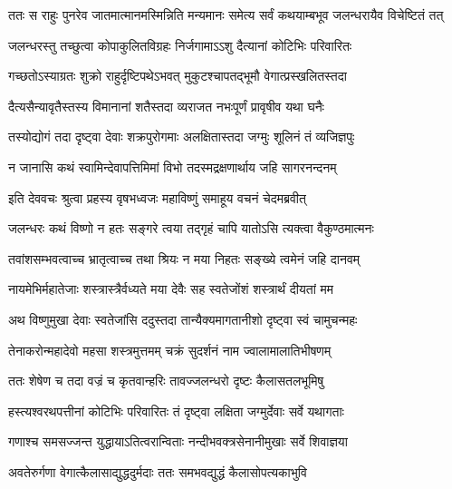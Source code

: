 \twolineshloka
{ततः स राहुः पुनरेव जातमात्मानमस्मिन्निति मन्यमानः}
{समेत्य सर्वं कथयाम्बभूव जलन्धरायैव विचेष्टितं तत्} %





\twolineshloka
{जलन्धरस्तु तच्छुत्वा कोपाकुलितविग्रहः}
{निर्जगामाऽऽशु दैत्यानां कोटिभिः परिवारितः} %

\twolineshloka
{गच्छतोऽस्याग्रतः शुक्रो राहुर्दृष्टिपथेऽभवत्}
{मुकुटश्चापतद्भूमौ वेगात्प्रस्खलितस्तदा} %

\twolineshloka
{दैत्यसैन्यावृतैस्तस्य विमानानां शतैस्तदा}
{व्यराजत नभःपूर्णं प्रावृषीव यथा घनैः} %

\twolineshloka
{तस्योद्योगं तदा दृष्ट्वा देवाः शक्रपुरोगमाः}
{अलक्षितास्तदा जग्मुः शूलिनं तं व्यजिज्ञपुः} %


\twolineshloka
{न जानासि कथं स्वामिन्देवापत्तिमिमां विभो}
{तदस्मद्रक्षणार्थाय जहि सागरनन्दनम्} %


\twolineshloka
{इति देववचः श्रुत्वा प्रहस्य वृषभध्वजः}
{महाविष्णुं समाहूय वचनं चेदमब्रवीत्} %


\twolineshloka
{जलन्धरः कथं विष्णो न हतः सङ्गरे त्वया}
{तद्गृहं चापि यातोऽसि त्यक्त्वा वैकुण्ठमात्मनः} %


\twolineshloka
{तवांशसम्भवत्वाच्च भ्रातृत्वाच्च तथा श्रियः}
{न मया निहतः सङ्ख्ये त्वमेनं जहि दानवम्} %


\twolineshloka
{नायमेभिर्महातेजाः शस्त्रास्त्रैर्वध्यते मया}
{देवैः सह स्वतेजोंशं शस्त्रार्थं दीयतां मम} %


\twolineshloka
{अथ विष्णुमुखा देवाः स्वतेजांसि ददुस्तदा}
{तान्यैक्यमागतानीशो दृष्ट्वा स्वं चामुचन्महः} %

\twolineshloka
{तेनाकरोन्महादेवो महसा शस्त्रमुत्तमम्}
{चक्रं सुदर्शनं नाम ज्वालामालातिभीषणम्} %

\twolineshloka
{ततः शेषेण च तदा वज्रं च कृतवान्हरिः}
{तावज्जलन्धरो दृष्टः कैलासतलभूमिषु} %

\twolineshloka
{हस्त्यश्वरथपत्तीनां कोटिभिः परिवारितः}
{तं दृष्ट्वा लक्षिता जग्मुर्देवाः सर्वे यथागताः} %

\twolineshloka
{गणाश्च समसज्जन्त युद्धायाऽतित्वरान्विताः}
{नन्दीभवक्त्रसेनानीमुखाः सर्वे शिवाज्ञया} %

\twolineshloka
{अवतेरुर्गणा वेगात्कैलासाद्युद्धदुर्मदाः}
{ततः समभवद्युद्धं कैलासोपत्यकाभुवि} %

